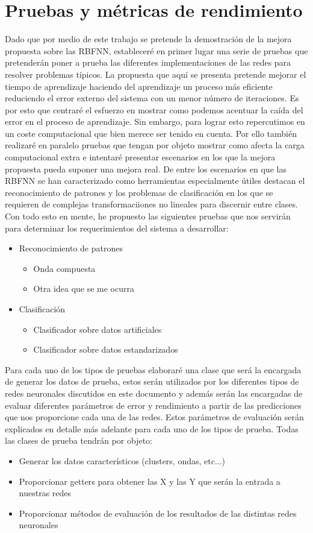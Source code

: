 \documentclass[10pt,a4paper, twocolumn]{report}
\begin{document}
\section{Pruebas y métricas de rendimiento}
Dado que por medio de este trabajo se pretende la demostración de la mejora propuesta sobre las RBFNN, estableceré en primer lugar una serie de pruebas que pretenderán poner a prueba las diferentes implementaciones de las redes para resolver problemas típicos.
La propuesta que aquí se presenta pretende mejorar el tiempo de aprendizaje haciendo del aprendizaje un proceso más eficiente reduciendo el error externo del sistema con un menor número de iteraciones. Es por esto que centraré el esfuerzo en mostrar como podemos acentuar la caída del error en el proceso de aprendizaje.
Sin embargo, para lograr esto repercutimos en un coste computacional que bien merece ser tenido en cuenta. Por ello también realizaré en paralelo pruebas que tengan por objeto mostrar como afecta la carga computacional extra e intentaré presentar escenarios en los que la mejora propuesta pueda suponer una mejora real.
De entre los escenarios en que las RBFNN se han caracterizado como herramientas especialmente útiles destacan el reconocimiento de patrones y los problemas de clasificación en los que se requieren de complejas transformaciiones no lineales para discernir entre clases.
Con todo esto en mente, he propuesto las siguientes pruebas que nos servirán para determinar los requerimientos del sistema a desarrollar:
\begin{itemize}
	\item Reconocimiento de patrones
	\begin{itemize}
		\item Onda compuesta
		\item Otra idea que se me ocurra
	\end{itemize}
	\item Clasificación
	\begin{itemize}
		\item Clasificador sobre datos artificiales
		\item Clasificador sobre datos estandarizados
	\end{itemize}
\end{itemize} 
Para cada uno de los tipos de pruebas elaboraré una clase que será la encargada de generar los datos de prueba, estos serán utilizados por los diferentes tipos de redes neuronales discutidos en este documento y además serán las encargadas de evaluar diferentes parámetros de error y rendimiento a partir de las predicciones que nos proporcione cada una de las redes. Estos parámetros de evaluación serán explicados en detalle más adelante para cada uno de los tipos de prueba. Todas las clases de prueba tendrán por objeto:
\begin{itemize}
	\item Generar los datos característicos (clusters, ondas, etc...)
	\item Proporcionar getters para obtener las X y las Y que serán la entrada a nuestras redes
	\item Proporcionar métodos de evaluación de los resultados de las distintas redes neuronales
\end{itemize}
\end{document}

